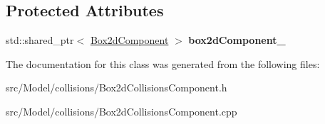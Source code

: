\subsection*{Protected Attributes}
\begin{DoxyCompactItemize}
\item 
std\+::shared\+\_\+ptr$<$ \hyperlink{classBox2dComponent}{Box2d\+Component} $>$ {\bfseries box2d\+Component\+\_\+}\hypertarget{classBox2dCollisionsComponent_ac0dca57c3b49a8ac6cd5a09413b2532c}{}\label{classBox2dCollisionsComponent_ac0dca57c3b49a8ac6cd5a09413b2532c}

\end{DoxyCompactItemize}


The documentation for this class was generated from the following files\+:\begin{DoxyCompactItemize}
\item 
src/\+Model/collisions/Box2d\+Collisions\+Component.\+h\item 
src/\+Model/collisions/Box2d\+Collisions\+Component.\+cpp\end{DoxyCompactItemize}
